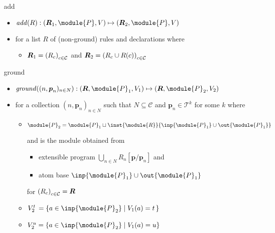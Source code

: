 \begin{frame}{add}
  \begin{itemize}
  \item $\mathit{add}(R): ( \boldsymbol{R}_1,\module{P},V )\mapsto( \boldsymbol{R}_2,\module{P},V )$
    \smallskip
  \item []
    for a list $R$ of (non-ground) rules and declarations
    \pause[2]%
    where
    \smallskip
    \begin{itemize}\normalsize
    \item $\boldsymbol{R}_1=\left(R_c\right)_{c\in\mathcal{C}}$ and
          $\boldsymbol{R}_2=\left(R_c\cup R(c)\right)_{c\in\mathcal{C}}$
    \end{itemize}
  \end{itemize}
\end{frame}
\begin{frame}{ground}
  \begin{itemize}
  \item $\mathit{ground}((n,\boldsymbol{p}_n)_{n\in N}): ( \boldsymbol{R},\module{P}_1,V_1 )\mapsto(\boldsymbol{R},\module{P}_2,V_2 )$
    \smallskip
  \item []
    for a collection $(n,\boldsymbol{p}_n)_{n\in N}$ such that $N\subseteq\mathcal{C}$ and $\boldsymbol{p}_n\in\mathcal{T}^k$ for some $k$
    \pause[2]%
    \smallskip
    where
    \smallskip
    \begin{itemize}\normalsize
    \item $\module{P}_2=\module{P}_1\sqcup\inst{\module{R}}{\inp{\module{P}_1}\cup\out{\module{P}_1}}$
      \par\smallskip
      and
      is the module obtained from
      \begin{itemize}\normalsize
      \item extensible program
        \(
        \bigcup_{n\in N}R_n[\boldsymbol{p}/\boldsymbol{p}_n]
        \)
        and
      \item atom base $\inp{\module{P}_1}\cup\out{\module{P}_1}$
      \end{itemize}
      for $\left(R_c\right)_{c\in\mathcal{C}}=\boldsymbol{R}$
      \smallskip
    \item   $V_2^t\,=\{a\in\inp{\module{P}_2}\mid V_1(a)=t\,\}$
    \item[] $V_2^u  =\{a\in\inp{\module{P}_2}\mid V_1(a)=u  \}$
    \end{itemize}
  \end{itemize}
\end{frame}
